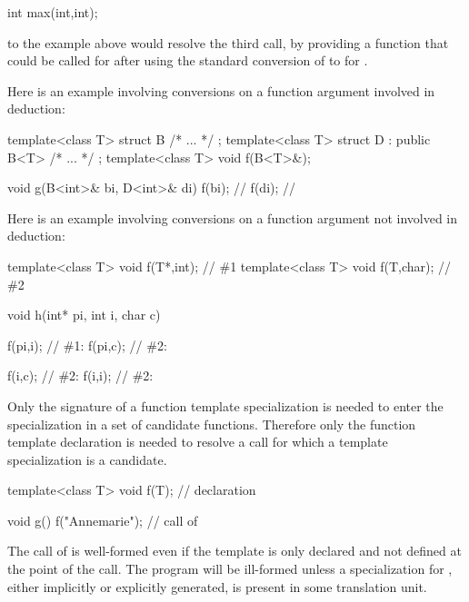 \begin{codeblock}
int max(int,int);
\end{codeblock}

to the example above would resolve the third call, by providing a function that
could be called for
after using the standard conversion of
to
for
.

\pnum
Here is an example involving conversions on a function argument involved in
deduction:

\begin{codeblock}
template<class T> struct B { /* ... */ };
template<class T> struct D : public B<T> { /* ... */ };
template<class T> void f(B<T>&);

void g(B<int>& bi, D<int>& di)
{
	f(bi);			// 
	f(di);			// 
}
\end{codeblock}

\pnum
Here is an example involving conversions on a function argument not involved in
deduction:

\begin{codeblock}
template<class T> void f(T*,int);	// \#1
template<class T> void f(T,char);	// \#2

void h(int* pi, int i, char c)
{
	f(pi,i);		// \#1: 
	f(pi,c);		// \#2: 

	f(i,c);			// \#2: 
	f(i,i);			// \#2: 
}
\end{codeblock}
\exitexampleb

\pnum
Only the signature of a function template specialization is needed to enter the
specialization in a set of candidate functions.
Therefore only the function template declaration is needed to resolve a call
for which a template specialization is a candidate.
\enterexample

\begin{codeblock}
template<class T> void f(T);	// declaration

void g()
{
	f("Annemarie");		// call of 
}
\end{codeblock}

The call of
is well-formed even if the template
is only declared and not defined at the point of the call.
The program will be ill-formed unless a specialization for
,
either implicitly or explicitly generated,
is present in some translation unit.
\exitexample%
